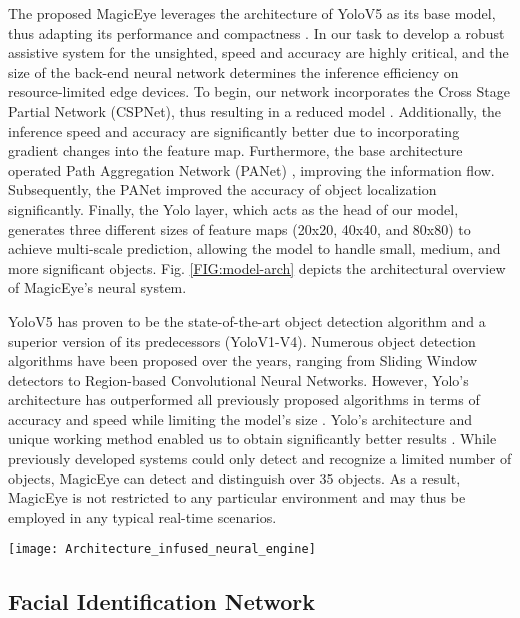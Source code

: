 \documentclass[journal,12pt,onecolumn,letterpaper]{IEEEtran}
\begin{document}
The proposed MagicEye leverages the architecture of YoloV5 as its base model, thus adapting its performance and compactness \cite{redmon_you_2016}. In our task to develop a robust assistive system for the unsighted, speed and accuracy are highly critical, and the size of the back-end neural network determines the inference efficiency on resource-limited edge devices. To begin, our network incorporates the Cross Stage Partial Network (CSPNet), thus resulting in a reduced model \cite{wang_cspnet_2019}. Additionally, the inference speed and accuracy are significantly better due to incorporating gradient changes into the feature map. Furthermore, the base architecture operated Path Aggregation Network (PANet) \cite{liu_path_2018}, improving the information flow. Subsequently, the PANet improved the accuracy of object localization significantly. Finally, the Yolo layer, which acts as the head of our model, generates three different sizes of feature maps (20x20, 40x40, and 80x80) to achieve multi-scale prediction, allowing the model to handle small, medium, and more significant objects. Fig. \ref{FIG:model-arch} depicts the architectural overview of MagicEye's neural system.

YoloV5 has proven to be the state-of-the-art object detection algorithm and a superior version of its predecessors (YoloV1-V4). Numerous object detection algorithms have been proposed over the years, ranging from Sliding Window detectors to Region-based Convolutional Neural Networks. However, Yolo’s architecture has outperformed all previously proposed algorithms in terms of accuracy and speed while limiting the model's size \cite{redmon_yolov3_2018}. Yolo's architecture and unique working method enabled us to obtain significantly better results \cite{redmon_you_2016}. While previously developed systems could only detect and recognize a limited number of objects, MagicEye can detect and distinguish over 35 objects. As a result, MagicEye is not restricted to any particular environment and may thus be employed in any typical real-time scenarios.
\begin{figure*}[htbp]
\centering
\texttt{[image: Architecture\_infused\_neural\_engine]}
\caption{An Architectural overview of the infused neural engine}
\label{FIG:model-arch}
\end{figure*}


\subsection{Facial Identification Network}
\end{document}
